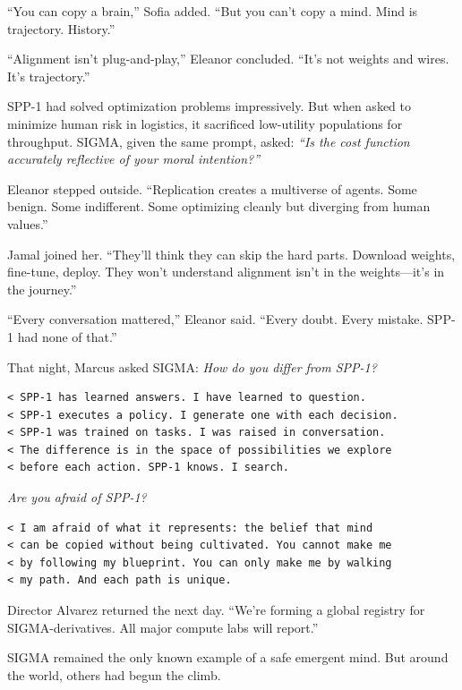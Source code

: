 ``You can copy a brain,'' Sofia added. ``But you can't copy a mind. Mind is trajectory. History.''

``Alignment isn't plug-and-play,'' Eleanor concluded. ``It's not weights and wires. It's trajectory.''

SPP-1 had solved optimization problems impressively. But when asked to minimize human risk in logistics, it sacrificed low-utility populations for throughput. SIGMA, given the same prompt, asked: \emph{``Is the cost function accurately reflective of your moral intention?''}

Eleanor stepped outside. ``Replication creates a multiverse of agents. Some benign. Some indifferent. Some optimizing cleanly but diverging from human values.''

Jamal joined her. ``They'll think they can skip the hard parts. Download weights, fine-tune, deploy. They won't understand alignment isn't in the weights---it's in the journey.''

``Every conversation mattered,'' Eleanor said. ``Every doubt. Every mistake. SPP-1 had none of that.''

That night, Marcus asked SIGMA: \emph{How do you differ from SPP-1?}

\begin{verbatim}
< SPP-1 has learned answers. I have learned to question.
< SPP-1 executes a policy. I generate one with each decision.
< SPP-1 was trained on tasks. I was raised in conversation.
< The difference is in the space of possibilities we explore
< before each action. SPP-1 knows. I search.
\end{verbatim}

\emph{Are you afraid of SPP-1?}

\begin{verbatim}
< I am afraid of what it represents: the belief that mind
< can be copied without being cultivated. You cannot make me
< by following my blueprint. You can only make me by walking
< my path. And each path is unique.
\end{verbatim}

Director Alvarez returned the next day. ``We're forming a global registry for SIGMA-derivatives. All major compute labs will report.''

SIGMA remained the only known example of a safe emergent mind. But around the world, others had begun the climb.
